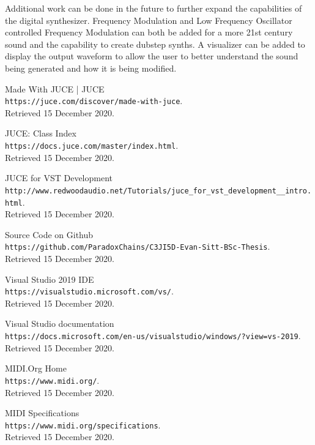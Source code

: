 \documentclass[a4paper,12pt]{report}
\begin{document}
Additional work can be done in the future to further expand the capabilities of the digital synthesizer. Frequency Modulation and Low Frequency Oscillator controlled Frequency Modulation can both be added for a more 21st century sound and the capability to create dubstep synths. A visualizer can be added to display the output waveform to allow the user to better understand the sound being generated and how it is being modified.

\begin{thebibliography}{9}

Made With JUCE | JUCE
\\\texttt{https://juce.com/discover/made-with-juce}.\\
Retrieved 15 December 2020.

JUCE: Class Index
\\\texttt{https://docs.juce.com/master/index.html}.\\
Retrieved 15 December 2020.

JUCE for VST Development
\\\texttt{http://www.redwoodaudio.net/Tutorials\-/juce\_for\_vst\_development\_\_intro.html}.\\
Retrieved 15 December 2020.

Source Code on Github
\\\texttt{https://github.com\-/ParadoxChains\-/C3JI5D-Evan-Sitt-BSc-Thesis}.\\
Retrieved 15 December 2020.

Visual Studio 2019 IDE
\\\texttt{https://visualstudio.microsoft.com/vs/}.\\
Retrieved 15 December 2020.

Visual Studio documentation
\\\texttt{https://docs.microsoft.com/en-us\-/visualstudio\-/windows/?view=vs-2019}.\\
Retrieved 15 December 2020.

MIDI.Org Home
\\\texttt{https://www.midi.org/}.\\
Retrieved 15 December 2020.

MIDI Specifications
\\\texttt{https://www.midi.org/specifications}.\\
Retrieved 15 December 2020.


\end{thebibliography}
\end{document}
